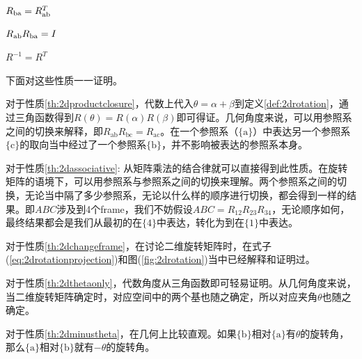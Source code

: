 \documentclass[12pt, a4paper, article, UTF8]{ctexart}
\begin{document}
\begin{mytheorem}
$R_\textnormal{ba} = R_\textnormal{ab}^T$ \label{th:2dtranspose}
\end{mytheorem}

\begin{mytheorem}
$R_\textnormal{ab} R_\textnormal{ba} = I$ \label{th:2dinverse}
\end{mytheorem}

\begin{mytheorem}
$R^{-1} = R^T$ \label{th:2dinversetranspose}
\end{mytheorem}

下面对这些性质一一证明。

对于性质\ref{th:2dproductclosure}，代数上代入$\theta=\alpha + \beta$到定义\ref{def:2drotation}，通过三角函数得到$R(\theta) = R(\alpha)R(\beta)$即可得证。几何角度来说，可以用参照系之间的切换来解释，即$R_\text{ab}R_\text{bc} = R_\text{ac}$。在一个参照系（$\{\text{a}\}$）中表达另一个参照系$\{\text{c}\}$的取向当中经过了一个参照系$\{\text{b}\}$，并不影响被表达的参照系本身。

对于性质\ref{th:2dassociative}:
从矩阵乘法的结合律就可以直接得到此性质。在旋转矩阵的语境下，可以用参照系与参照系之间的切换来理解。两个参照系之间的切换，无论当中隔了多少参照系，无论以什么样的顺序进行切换，都会得到一样的结果。即$ABC$涉及到4个frame，我们不妨假设$ABC=R_{12}R_{23}R_{34}$，无论顺序如何，最终结果都会是我们从最初的在$\{4\}$中表达，转化为到在$\{1\}$中表达。

对于性质\ref{th:2dchangeframe}，在讨论二维旋转矩阵时，在式子(\ref{eq:2drotationprojection})和图(\ref{fig:2drotation})当中已经解释和证明过。

对于性质\ref{th:2dthetaonly}，代数角度从三角函数即可轻易证明。从几何角度来说，当二维旋转矩阵确定时，对应空间中的两个基也随之确定，所以对应夹角$\theta$也随之确定。

对于性质\ref{th:2dminustheta}，在几何上比较直观。如果$\{\text{b}\}$相对$\{\text{a}\}$有$\theta$的旋转角，那么$\{\text{a}\}$相对$\{\text{b}\}$就有$-\theta$的旋转角。
\end{document}
